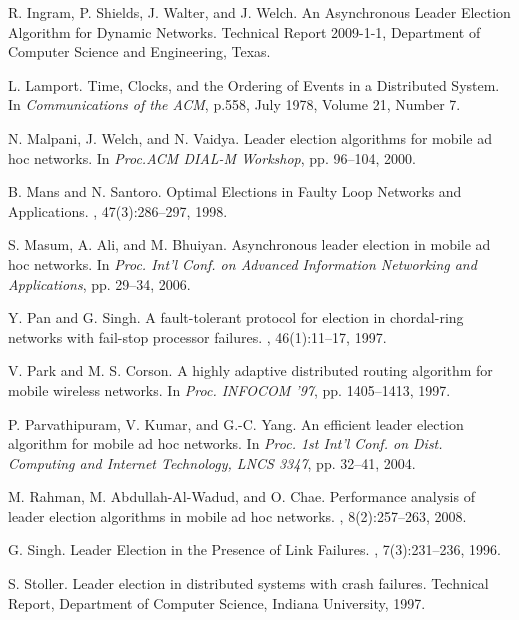 \begin{thebibliography}{1}
	R. Ingram, P. Shields, J. Walter, and J. Welch.
	\newblock An Asynchronous Leader Election Algorithm for Dynamic Networks. Technical Report 2009-1-1, Department of Computer Science and Engineering, Texas.
	
	L. Lamport.
	\newblock  Time, Clocks, and the Ordering of Events in a Distributed System.
	\newblock In {\em Communications of the ACM}, p.558, July 1978, Volume 21, Number 7.
	
	
	N. Malpani, J. Welch, and N. Vaidya.
	\newblock  Leader election algorithms for mobile ad hoc networks.
	\newblock In {\em Proc.ACM DIAL-M Workshop}, pp. 96–104, 2000.
	
	B. Mans and N. Santoro.
	\newblock  Optimal Elections in Faulty Loop Networks and Applications.
	, 47(3):286–297, 1998.
	
	S. Masum, A. Ali, and M. Bhuiyan.
	\newblock  Asynchronous leader election in mobile ad hoc networks.
	\newblock In {\em Proc. Int’l Conf. on Advanced Information Networking and Applications}, pp. 29–34, 2006.
	
	Y. Pan and G. Singh.
	\newblock A fault-tolerant protocol for election in chordal-ring networks with fail-stop processor failures.
	, 46(1):11–17, 1997.
	
	V. Park and M. S. Corson.
	\newblock A highly adaptive distributed routing algorithm for mobile wireless networks.
	\newblock In {\em Proc. INFOCOM ’97}, pp. 1405–1413, 1997.
	
	P. Parvathipuram, V. Kumar, and G.-C. Yang.
	\newblock An efficient leader election algorithm for mobile ad hoc networks.
	\newblock In {\em Proc. 1st Int’l Conf. on Dist. Computing and Internet Technology, LNCS 3347}, pp. 32–41, 2004.
	
	M. Rahman, M. Abdullah-Al-Wadud, and O. Chae.
	\newblock Performance analysis of leader election algorithms in mobile ad hoc networks.
	, 8(2):257–263, 2008.
	
	G. Singh.
	\newblock Leader Election in the Presence of Link Failures.
	, 7(3):231–236, 1996.
	
	S. Stoller.
	\newblock Leader election in distributed systems with crash failures.
	\newblock Technical Report, Department of Computer Science, Indiana University, 1997.
	

\end{thebibliography}
